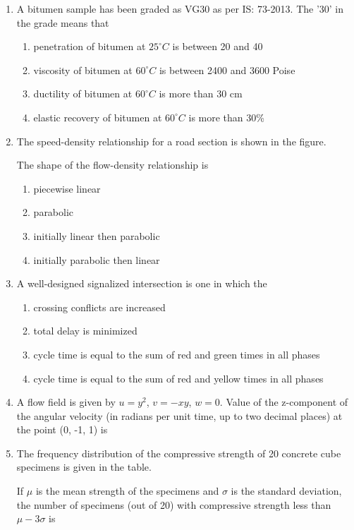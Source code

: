 \documentclass[journal,12pt,onecolumn]{IEEEtran}
\theoremstyle{remark}
\begin{document}
\begin{enumerate}
\item A bitumen sample has been graded as VG30 as per IS: 73-2013. The '30' in the grade means that
    \begin{enumerate}
        \item penetration of bitumen at $25^{\circ}C$ is between 20 and 40
        \item viscosity of bitumen at $60^{\circ}C$ is between 2400 and 3600 Poise
        \item ductility of bitumen at $60^{\circ}C$ is more than 30 cm
        \item elastic recovery of bitumen at $60^{\circ}C$ is more than 30\%
    \end{enumerate}
\item The speed-density relationship for a road section is shown in the figure.\\
  \begin{figure}[H]
        \centering
         
    \end{figure}
The shape of the flow-density relationship is
    \begin{enumerate}
        \item piecewise linear
        \item parabolic
        \item initially linear then parabolic
        \item initially parabolic then linear
    \end{enumerate}
\item A well-designed signalized intersection is one in which the
    \begin{enumerate}
        \item crossing conflicts are increased
        \item total delay is minimized
        \item cycle time is equal to the sum of red and green times in all phases
        \item cycle time is equal to the sum of red and yellow times in all phases
    \end{enumerate}
\item A flow field is given by $u = y^2$, $v = -xy$, $w = 0$. Value of the z-component of the angular velocity (in radians per unit time, up to two decimal places) at the point (0, -1, 1) is \underline{\hspace{1cm}}
\item The frequency distribution of the compressive strength of 20 concrete cube specimens is given in the table.
  \begin{table}[H]
        \centering
          
    \end{table}
    If $\mu$ is the mean strength of the specimens and $\sigma$ is the standard deviation, the number of specimens (out of 20) with compressive strength less than $\mu - 3\sigma$ is \underline{\hspace{1cm}}
    

\end{enumerate}
\end{document}
